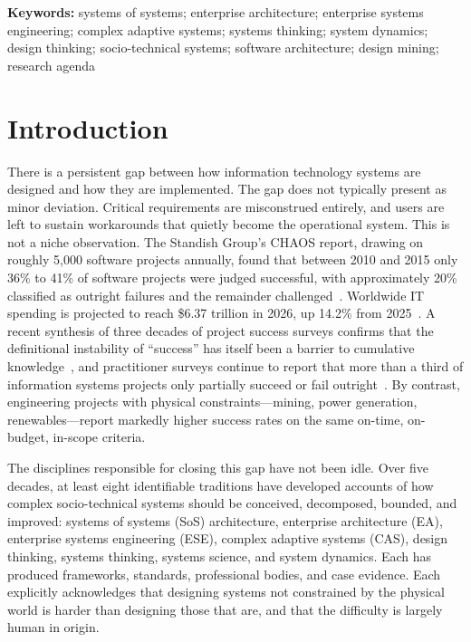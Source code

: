 \documentclass[11pt,a4paper]{article}
\begin{document}
\vspace{0.5em}
\noindent\textbf{Keywords:} systems of systems; enterprise architecture;
enterprise systems engineering; complex adaptive systems; systems thinking;
system dynamics; design thinking; socio-technical systems; software
architecture; design mining; research agenda
\vspace{1em}

\section{Introduction}

There is a persistent gap between how information technology systems are
designed and how they are implemented. The gap does not typically present as
minor deviation. Critical requirements are misconstrued entirely, and users are
left to sustain workarounds that quietly become the operational system. This is
not a niche observation. The Standish Group's CHAOS report, drawing on roughly
5{,}000 software projects annually, found that between 2010 and 2015 only 36\%
to 41\% of software projects were judged successful, with approximately 20\%
classified as outright failures and the remainder challenged~\citep{standish2015}.
Worldwide IT spending is projected to reach \$6.37 trillion in
2026, up 14.2\% from 2025~\citep{gartner2026}. A recent synthesis of three decades of project success
surveys confirms that the definitional instability of ``success'' has itself
been a barrier to cumulative knowledge~\citep{loureiro2024}, and practitioner
surveys continue to report that more than a third of information systems
projects only partially succeed or fail outright~\citep{pereira2021}. By
contrast, engineering projects with physical constraints---mining, power
generation, renewables---report markedly higher success rates on the same
on-time, on-budget, in-scope criteria.

The disciplines responsible for closing this gap have not been idle. Over five
decades, at least eight identifiable traditions have developed accounts of how
complex socio-technical systems should be conceived, decomposed, bounded, and
improved: systems of systems (SoS) architecture, enterprise architecture (EA),
enterprise systems engineering (ESE), complex adaptive systems (CAS), design
thinking, systems thinking, systems science, and system dynamics. Each has
produced frameworks, standards, professional bodies, and case evidence. Each
explicitly acknowledges that designing systems not constrained by the physical
world is harder than designing those that are, and that the difficulty is
largely human in origin.
\end{document}
